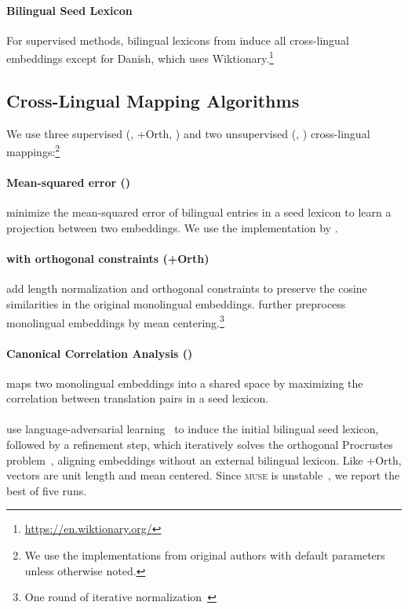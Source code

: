 \paragraph{Bilingual Seed Lexicon} For supervised methods, bilingual
lexicons from \citet{rolston2016collection} induce all cross-lingual
embeddings except for Danish, which uses Wiktionary.\footnote{\url{https://en.wiktionary.org/}}

\subsection{Cross-Lingual Mapping Algorithms}
\label{sec:algorithms}

We use three supervised (, +Orth, ) and
two unsupervised (, ) cross-lingual
mappings:\footnote{We use the implementations
  from original authors with default parameters unless otherwise
  noted.}

\paragraph{Mean-squared error ()}
\citet{DBLP:journals/corr/MikolovLS13} minimize the mean-squared error
of bilingual entries in a seed lexicon to learn a projection between
two embeddings. We use the implementation by
\citet{artetxe2016learning}.

\paragraph{ with orthogonal constraints (+Orth)}
\citet{xing-EtAl:2015:NAACL-HLT} add length normalization
and orthogonal constraints to preserve the
cosine similarities in the original monolingual embeddings.
\citet{artetxe2016learning} further preprocess monolingual embeddings
by mean centering.\footnote{One round of
iterative  normalization~\cite{iternorm}}

\paragraph{Canonical Correlation Analysis ()}
\citet{faruqui-dyer:2014:EACL}
maps two
monolingual embeddings into a shared space by maximizing the
correlation between translation pairs in a seed lexicon.

\paragraph{\citet[]{lample2018word}}
use language-adversarial learning~\citep{ganin} to induce the initial bilingual seed lexicon, followed by a refinement step, which iteratively
solves the orthogonal Procrustes problem~\cite{Schonemann1966,artetxe-labaka-agirre:2017:Long}, aligning embeddings without an external
bilingual lexicon.
Like +Orth, vectors are unit length and mean
centered.
Since \textsc{muse} is unstable~\cite{self_learn,eigenval_sim}, we
report the best of five runs.

